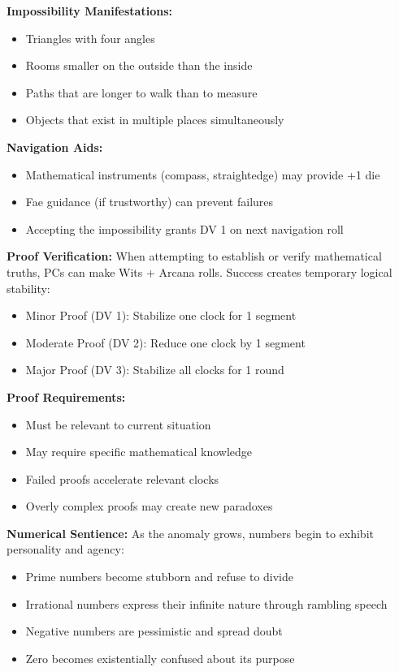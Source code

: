 \documentclass[11pt]{article}
\begin{document}
\textbf{Impossibility Manifestations:}
\begin{itemize}
    \item Triangles with four angles
    \item Rooms smaller on the outside than the inside
    \item Paths that are longer to walk than to measure
    \item Objects that exist in multiple places simultaneously
\end{itemize}

\textbf{Navigation Aids:}
\begin{itemize}
    \item Mathematical instruments (compass, straightedge) may provide +1 die
    \item Fae guidance (if trustworthy) can prevent failures
    \item Accepting the impossibility grants DV 1 on next navigation roll
\end{itemize}

\textbf{Proof Verification:}
When attempting to establish or verify mathematical truths, PCs can make Wits + Arcana rolls. Success creates temporary logical stability:
\begin{itemize}
    \item Minor Proof (DV 1): Stabilize one clock for 1 segment
    \item Moderate Proof (DV 2): Reduce one clock by 1 segment
    \item Major Proof (DV 3): Stabilize all clocks for 1 round
\end{itemize}

\textbf{Proof Requirements:}
\begin{itemize}
    \item Must be relevant to current situation
    \item May require specific mathematical knowledge
    \item Failed proofs accelerate relevant clocks
    \item Overly complex proofs may create new paradoxes
\end{itemize}

\textbf{Numerical Sentience:}
As the anomaly grows, numbers begin to exhibit personality and agency:
\begin{itemize}
    \item Prime numbers become stubborn and refuse to divide
    \item Irrational numbers express their infinite nature through rambling speech
    \item Negative numbers are pessimistic and spread doubt
    \item Zero becomes existentially confused about its purpose
\end{itemize}
\end{document}
